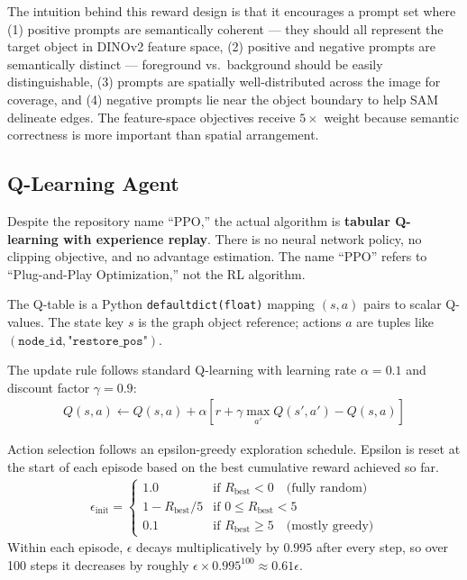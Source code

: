 \documentclass[11pt]{article}
\begin{document}
The intuition behind this reward design is that it encourages a prompt set where (1) positive prompts are semantically coherent --- they should all represent the target object in DINOv2 feature space, (2) positive and negative prompts are semantically distinct --- foreground vs.\ background should be easily distinguishable, (3) prompts are spatially well-distributed across the image for coverage, and (4) negative prompts lie near the object boundary to help SAM delineate edges. The feature-space objectives receive $5\times$ weight because semantic correctness is more important than spatial arrangement.

\subsection{Q-Learning Agent}

Despite the repository name ``PPO,'' the actual algorithm is \textbf{tabular Q-learning with experience replay}. There is no neural network policy, no clipping objective, and no advantage estimation. The name ``PPO'' refers to ``Plug-and-Play Optimization,'' not the RL algorithm.

The Q-table is a Python \texttt{defaultdict(float)} mapping $(s, a)$ pairs to scalar Q-values. The state key $s$ is the graph object reference; actions $a$ are tuples like $(\texttt{node\_id}, \texttt{"restore\_pos"})$.

The update rule follows standard Q-learning with learning rate $\alpha = 0.1$ and discount factor $\gamma = 0.9$:
\begin{align}
Q(s, a) \leftarrow Q(s, a) + \alpha \left[ r + \gamma \max_{a'} Q(s', a') - Q(s, a) \right]
\end{align}

Action selection follows an epsilon-greedy exploration schedule. Epsilon is reset at the start of each episode based on the best cumulative reward achieved so far.
\begin{align}
\epsilon_{\text{init}} = \begin{cases}
1.0 & \text{if } R_{\text{best}} < 0 \quad \text{(fully random)} \\
1 - R_{\text{best}} / 5 & \text{if } 0 \leq R_{\text{best}} < 5 \\
0.1 & \text{if } R_{\text{best}} \geq 5 \quad \text{(mostly greedy)}
\end{cases}
\end{align}
Within each episode, $\epsilon$ decays multiplicatively by $0.995$ after every step, so over 100 steps it decreases by roughly $\epsilon \times 0.995^{100} \approx 0.61\epsilon$.
\end{document}
